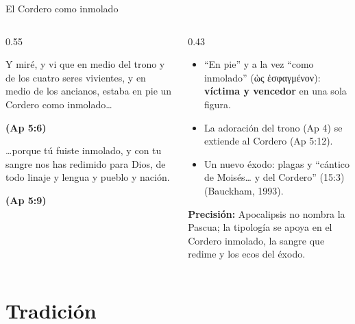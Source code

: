 \documentclass[hyperref={bookmarks=false},aspectratio=169]{beamer}
\newcommand{\grc}[1]{\foreignlanguage{ancientgreek}{#1}}
\newcommand{\fuente}[1]{\par\hfill{\upshape\bfseries\footnotesize\textcolor{tierraroja}{#1}}}
\newcommand{\destacar}[1]{\textbf{\textcolor{tierraroja}{#1}}}
\newcommand{\precision}[1]{{\footnotesize\color{sepia}\textbf{Precisión:} #1}}
\begin{document}
\begin{frame}{El Cordero como inmolado}
\begin{columns}[c,onlytextwidth]
\begin{column}{0.55\textwidth}
\begin{cita}Y miré, y vi que en medio del trono y de los cuatro seres vivientes, y en medio de los ancianos, estaba en pie un Cordero como inmolado\ldots\fuente{(Ap 5:6)}\end{cita}
\begin{cita}\ldots{}porque tú fuiste inmolado, y con tu sangre nos has redimido para Dios, de todo linaje y lengua y pueblo y nación.\fuente{(Ap 5:9)}\end{cita}
\end{column}
\begin{column}{0.43\textwidth}\small\RaggedRight
\begin{itemize}\small
\item ``En pie'' y a la vez ``como inmolado'' (\grc{ὡς ἐσφαγμένον}): \destacar{víctima y vencedor} en una sola figura.
\item La adoración del trono (Ap 4) se extiende al Cordero (Ap 5:12).
\item Un nuevo éxodo: plagas y ``cántico de Moisés\ldots{} y del Cordero'' (15:3) (Bauckham, 1993).
\end{itemize}
\precision{Apocalipsis no nombra la Pascua; la tipología se apoya en el Cordero inmolado, la sangre que redime y los ecos del éxodo.}
\end{column}
\end{columns}
\end{frame}

\section{Tradición}
\end{document}
